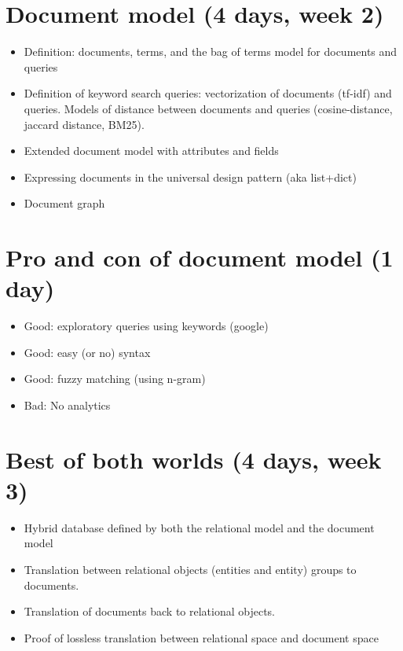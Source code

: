 		\section{Document model (4 days, week 2)}
	\begin{itemize}
		\item Definition: documents, terms, and the bag of terms model for documents and queries
		\item Definition of keyword search queries: vectorization of documents (tf-idf) and queries.	Models of distance between documents and queries (cosine-distance, jaccard distance, BM25).
		\item Extended document model with attributes and fields
		\item Expressing documents in the universal design pattern (aka list+dict)
		\item Document graph
	\end{itemize}

		\section{Pro and con of document model (1 day)}
	\begin{itemize}
		\item Good: exploratory queries using keywords (google)
		\item Good: easy (or no) syntax
		\item Good: fuzzy matching (using n-gram)
		\item Bad: No analytics
	\end{itemize}
		
		\section{Best of both worlds (4 days, week 3)}
	\begin{itemize}
		\item Hybrid database defined by both the relational model and the document model
		\item Translation between relational objects (entities and entity) groups to documents.
		\item Translation of documents back to relational objects.
		\item Proof of lossless translation between relational space and document space
	\end{itemize}